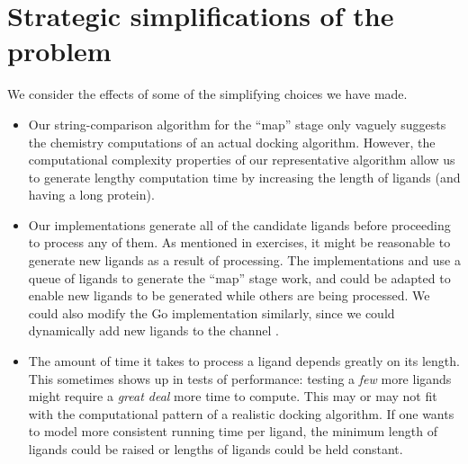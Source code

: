 \documentclass[letterpaper,10pt,openany,oneside]{sphinxmanual}
\begin{document}
\section{Strategic simplifications of the problem}
\label{evaluation/evaluation:strategic-simplifications-of-the-problem}
We consider the effects of some of the simplifying choices we have made.
\begin{itemize}
\item {} 
Our string-comparison algorithm for the “map” stage only vaguely suggests the chemistry computations of an actual docking algorithm.  However, the computational complexity properties of our representative algorithm allow us to generate lengthy computation time by increasing the length of ligands (and having a long protein).

\item {} 
Our implementations generate all of the candidate ligands before proceeding to process any of them. As mentioned in exercises, it might be reasonable to generate new ligands as a result of processing. The implementations  and  use a queue of ligands to generate the “map” stage work, and could be adapted to enable new ligands to be generated while others are being processed. We could also modify the Go implementation  similarly, since we could dynamically add new ligands to the channel .

\item {} 
The amount of time it takes to process a ligand depends greatly on its length. This sometimes shows up in tests of performance: testing a \emph{few} more ligands might require a \emph{great deal} more time to compute. This may or may not fit with the computational pattern of a realistic docking algorithm. If one wants to model more consistent running time per ligand, the minimum length of ligands could be raised or lengths of ligands could be held constant.

\end{itemize}
\end{document}

